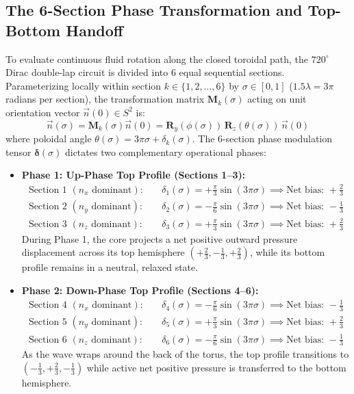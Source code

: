 \documentclass[11pt,a4paper]{article}
\begin{document}
	\subsection{The 6-Section Phase Transformation and Top-Bottom Handoff}
	To evaluate continuous fluid rotation along the closed toroidal path, the $720^\circ$ Dirac double-lap circuit is divided into 6 equal sequential sections. Parameterizing locally within section $k \in \{1, 2, \dots, 6\}$ by $\sigma \in [0,1]$ ($1.5\lambda = 3\pi$ radians per section), the transformation matrix $\mathbf{M}_k(\sigma)$ acting on unit orientation vector $\vec{n}(0) \in S^2$ is:
	\begin{equation}
		\vec{n}(\sigma) = \mathbf{M}_k(\sigma) \vec{n}(0) = \mathbf{R}_y(\phi(\sigma)) \, \mathbf{R}_z(\theta(\sigma)) \, \vec{n}(0)
	\end{equation}
	where poloidal angle $\theta(\sigma) = 3\pi \sigma + \delta_k(\sigma)$. The 6-section phase modulation tensor $\boldsymbol{\delta}(\sigma)$ dictates two complementary operational phases:
	\begin{itemize}
		\item \textbf{Phase 1: Up-Phase Top Profile (Sections 1--3):}
		\begin{align}
			\text{Section 1 } (n_x \text{ dominant}): & \quad \delta_1(\sigma) = +\frac{\pi}{3} \sin(3\pi \sigma) \implies \text{Net bias: } +\frac{2}{3} \\
			\text{Section 2 } (n_y \text{ dominant}): & \quad \delta_2(\sigma) = -\frac{\pi}{6} \sin(3\pi \sigma) \implies \text{Net bias: } -\frac{1}{3} \\
			\text{Section 3 } (n_z \text{ dominant}): & \quad \delta_3(\sigma) = +\frac{\pi}{3} \sin(3\pi \sigma) \implies \text{Net bias: } +\frac{2}{3}
		\end{align}
		During Phase 1, the core projects a net positive outward pressure displacement across its top hemisphere $(+\frac{2}{3}, -\frac{1}{3}, +\frac{2}{3})$, while its bottom profile remains in a neutral, relaxed state.
		
		\item \textbf{Phase 2: Down-Phase Top Profile (Sections 4--6):}
		\begin{align}
			\text{Section 4 } (n_x \text{ dominant}): & \quad \delta_4(\sigma) = -\frac{\pi}{6} \sin(3\pi \sigma) \implies \text{Net bias: } -\frac{1}{3} \\
			\text{Section 5 } (n_y \text{ dominant}): & \quad \delta_5(\sigma) = +\frac{\pi}{3} \sin(3\pi \sigma) \implies \text{Net bias: } +\frac{2}{3} \\
			\text{Section 6 } (n_z \text{ dominant}): & \quad \delta_6(\sigma) = -\frac{\pi}{6} \sin(3\pi \sigma) \implies \text{Net bias: } -\frac{1}{3}
		\end{align}
		As the wave wraps around the back of the torus, the top profile transitions to $(-\frac{1}{3}, +\frac{2}{3}, -\frac{1}{3})$ while active net positive pressure is transferred to the bottom hemisphere.
	\end{itemize}
\end{document}
